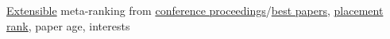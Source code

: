 {\href{https://en.wikipedia.org/wiki/Extensible_programming}{Extensible} meta-ranking from \href{https://dblp.org/}{conference proceedings}/\href{https://jeffhuang.com/best_paper_awards/}{best papers}, \href{https://drafty.cs.brown.edu/csopenrankings/placement-rank.html}{placement rank}, paper age, interests}
